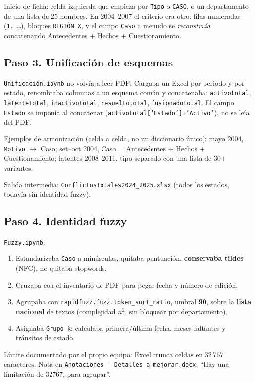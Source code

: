 \documentclass[11pt,a4paper]{article}
\begin{document}
Inicio de ficha: celda izquierda que empieza por \texttt{Tipo} o \texttt{CASO}, o un departamento de una lista de 25 nombres. En 2004--2007 el criterio era otro: filas numeradas (\texttt{1.\ \ldots}), bloques \texttt{REGIÓN X}, y el campo \texttt{Caso} a menudo se \emph{reconstruía} concatenando Antecedentes + Hechos + Cuestionamiento.

\subsection{Paso 3. Unificación de esquemas}

\texttt{Unificación.ipynb} no volvía a leer PDF. Cargaba un Excel por periodo y por estado, renombraba columnas a un esquema común y concatenaba: \texttt{activototal}, \texttt{latentetotal}, \texttt{inactivototal}, \texttt{resueltototal}, \texttt{fusionadototal}. El campo \texttt{Estado} se imponía al concatenar (\texttt{activototal['Estado']='Activo'}), no se leía del PDF.

Ejemplos de armonización (celda a celda, no un diccionario único): mayo 2004, \texttt{Motivo} $\to$ Caso; set--oct 2004, Caso = Antecedentes + Hechos + Cuestionamiento; latentes 2008--2011, tipo separado con una lista de 30+ variantes.

Salida intermedia: \texttt{ConflictosTotales2024\_2025.xlsx} (todos los estados, todavía sin identidad fuzzy).

\subsection{Paso 4. Identidad fuzzy}

\texttt{Fuzzy.ipynb}:

\begin{enumerate}
  \item Estandarizaba \texttt{Caso} a minúsculas, quitaba puntuación, \textbf{conservaba tildes} (NFC), no quitaba stopwords.
  \item Cruzaba con el inventario de PDF para pegar fecha y número de edición.
  \item Agrupaba con \texttt{rapidfuzz.fuzz.token\_sort\_ratio}, umbral \textbf{90}, sobre la \textbf{lista nacional} de textos (complejidad $n^2$, sin bloquear por departamento).
  \item Asignaba \texttt{Grupo\_k}; calculaba primera/última fecha, meses faltantes y tránsitos de estado.
\end{enumerate}

Límite documentado por el propio equipo: Excel trunca celdas en 32\,767 caracteres. Nota en \texttt{Anotaciones - Detalles a mejorar.docx}: ``Hay una limitación de 32767, para agrupar''.
\end{document}
